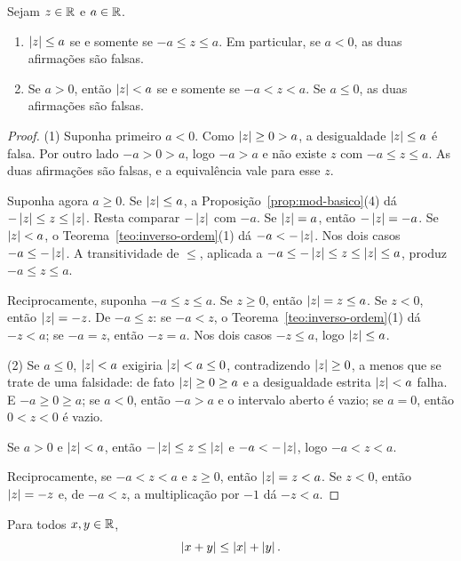 \documentclass[11pt,a4paper]{article}
\begin{document}
\begin{teorema}\label{teo:caracterizacao}
Sejam $z\in\mathbb{R}$ e $a\in\mathbb{R}$.
\begin{enumerate}
\item $\left\lvert z \right\rvert\le a$ se e somente se $-a\le z\le a$. Em particular, se $a<0$, as duas afirmações são falsas.
\item Se $a>0$, então $\left\lvert z \right\rvert<a$ se e somente se $-a<z<a$. Se $a\le 0$, as duas afirmações são falsas.
\end{enumerate}
\end{teorema}

\begin{proof}
(1) Suponha primeiro $a<0$. Como $\left\lvert z \right\rvert\ge 0>a$, a desigualdade $\left\lvert z \right\rvert\le a$ é falsa. Por outro lado $-a>0>a$, logo $-a>a$ e não existe $z$ com $-a\le z\le a$. As duas afirmações são falsas, e a equivalência vale para esse $z$.

Suponha agora $a\ge 0$. Se $\left\lvert z \right\rvert\le a$, a Proposição~\ref{prop:mod-basico}(4) dá $-\left\lvert z \right\rvert\le z\le\left\lvert z \right\rvert$. Resta comparar $-\left\lvert z \right\rvert$ com $-a$. Se $\left\lvert z \right\rvert=a$, então $-\left\lvert z \right\rvert=-a$. Se $\left\lvert z \right\rvert<a$, o Teorema~\ref{teo:inverso-ordem}(1) dá $-a<-\left\lvert z \right\rvert$. Nos dois casos $-a\le -\left\lvert z \right\rvert$. A transitividade de $\le$, aplicada a $-a\le -\left\lvert z \right\rvert\le z\le\left\lvert z \right\rvert\le a$, produz $-a\le z\le a$.

Reciprocamente, suponha $-a\le z\le a$. Se $z\ge 0$, então $\left\lvert z \right\rvert=z\le a$. Se $z<0$, então $\left\lvert z \right\rvert=-z$. De $-a\le z$: se $-a<z$, o Teorema~\ref{teo:inverso-ordem}(1) dá $-z<a$; se $-a=z$, então $-z=a$. Nos dois casos $-z\le a$, logo $\left\lvert z \right\rvert\le a$.

(2) Se $a\le 0$, $\left\lvert z \right\rvert<a$ exigiria $\left\lvert z \right\rvert<a\le 0$, contradizendo $\left\lvert z \right\rvert\ge 0$, a menos que se trate de uma falsidade: de fato $\left\lvert z \right\rvert\ge 0\ge a$ e a desigualdade estrita $\left\lvert z \right\rvert<a$ falha. E $-a\ge 0\ge a$; se $a<0$, então $-a>a$ e o intervalo aberto é vazio; se $a=0$, então $0<z<0$ é vazio.

Se $a>0$ e $\left\lvert z \right\rvert<a$, então $-\left\lvert z \right\rvert\le z\le\left\lvert z \right\rvert$ e $-a<-\left\lvert z \right\rvert$, logo $-a<z<a$.

Reciprocamente, se $-a<z<a$ e $z\ge 0$, então $\left\lvert z \right\rvert=z<a$. Se $z<0$, então $\left\lvert z \right\rvert=-z$ e, de $-a<z$, a multiplicação por $-1$ dá $-z<a$.
\end{proof}

\begin{teorema}\label{teo:triangular}
Para todos $x,y\in\mathbb{R}$,
\[
\left\lvert x+y \right\rvert\le\left\lvert x \right\rvert+\left\lvert y \right\rvert.
\]
\end{teorema}
\end{document}
